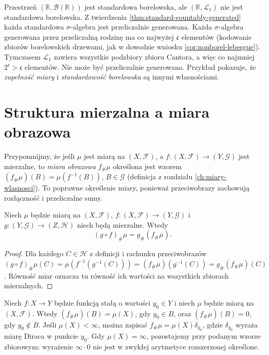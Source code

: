 \begin{przyklad}
\label{ex:completion-not-standard}
Przestrzeń $(\mathbb R,\mathcal B(\mathbb R))$ jest
standardowa borelowska, ale
$(\mathbb R,\mathcal L_1)$ nie jest standardowa borelowska.
Z twierdzenia \ref{thm:standard-countably-generated}
każda standardowa $\sigma$-algebra jest przeliczalnie
generowana. Każda $\sigma$-algebra generowana przez
przeliczalną rodzinę ma co najwyżej $\mathfrak c$
elementów (kodowanie zbiorów borelowskich drzewami,
jak w dowodzie wniosku \ref{cor:nonborel-lebesgue}).
Tymczasem $\mathcal L_1$ zawiera wszystkie podzbiory
zbioru Cantora, a więc co najmniej $2^{\mathfrak c}>
\mathfrak c$ elementów. Nie może być przeliczalnie
generowana. Przykład pokazuje, że \emph{zupełność miary}
i \emph{standardowość borelowska} są innymi własnościami.
\end{przyklad}

\section{Struktura mierzalna a miara obrazowa}

Przypomnijmy, że jeśli $\mu$ jest miarą na $(X,\mathcal F)$,
a $f:(X,\mathcal F)\to(Y,\mathcal G)$ jest mierzalne,
to \emph{miara obrazowa} $f_\#\mu$ określona jest wzorem
$(f_\#\mu)(B)=\mu(f^{-1}(B))$, $B\in\mathcal G$
(definicja z rozdziału \ref{ch:miary-wlasnosci}).
To poprawne określenie miary, ponieważ przeciwobrazy
zachowują rozłączność i przeliczalne sumy.

\begin{twierdzenie}
\label{thm:pushforward-composition}
Niech $\mu$ będzie miarą na $(X,\mathcal F)$,
$f:(X,\mathcal F)\to(Y,\mathcal G)$ i
$g:(Y,\mathcal G)\to(Z,\mathcal H)$ niech będą mierzalne.
Wtedy
\[
(g\circ f)_\#\mu=g_\#(f_\#\mu).
\]
\end{twierdzenie}
\begin{proof}
Dla każdego $C\in\mathcal H$ z definicji i
rachunku przeciwobrazów
$(g\circ f)_\#\mu(C)=\mu(f^{-1}(g^{-1}(C)))
=(f_\#\mu)(g^{-1}(C))=g_\#(f_\#\mu)(C)$.
Równość miar oznacza tu równość ich wartości
na wszystkich zbiorach mierzalnych.
\end{proof}

\begin{przyklad}
Niech $f:X\to Y$ będzie funkcją stałą o wartości
$y_0\in Y$ i niech $\mu$ będzie miarą na $(X,\mathcal F)$.
Wtedy $(f_\#\mu)(B)=\mu(X)$, gdy $y_0\in B$, oraz
$(f_\#\mu)(B)=0$, gdy $y_0\notin B$. Jeśli $\mu(X)<\infty$, można zapisać
$f_\#\mu=\mu(X)\delta_{y_0}$, gdzie $\delta_{y_0}$
wyraża miarę Diraca w punkcie $y_0$.
Gdy $\mu(X)=\infty$, pozostajemy przy podanym wzorze
zbiorowym: wyrażenie $\infty\cdot0$ nie jest w zwykłej
arytmetyce rozszerzonej określone.
\end{przyklad}

